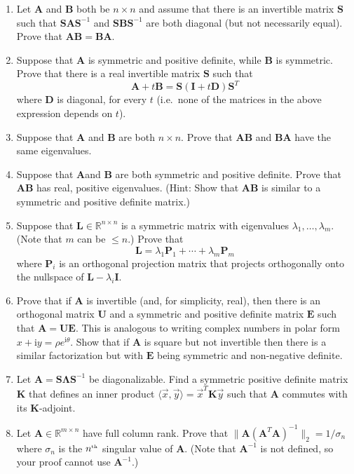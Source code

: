 \documentclass[11pt,fleqn]{article}
\newcommand{\mat}[1]{\mathbf{#1}}
\newcommand{\imag}{\mathrm{i}}
\begin{document}
\begin{enumerate}
\item Let $\mathbf{A}$ and $\mathbf{B}$ both be $n\times n$ and assume that there is an invertible matrix $\mathbf{S}$ such that $\mathbf{SAS}^{-1}$ and  $\mathbf{SBS}^{-1}$ are both diagonal (but not necessarily equal). Prove that $\mathbf{AB} = \mathbf{BA}$.

\item Suppose that $\mathbf{A}$ is symmetric and positive definite, while $\mathbf{B}$ is symmetric. Prove that there is a real invertible matrix $\mathbf{S}$ such that
\[\mathbf{A} + t \mathbf{B} = \mathbf{S}\left(\mathbf{I} + t\mathbf{D}\right)\mathbf{S}^T\]
where $\mathbf{D}$ is diagonal, for every $t$ (i.e.\ none of the matrices in the above expression depends on $t$).

\item Suppose that $\mathbf{A}$ and $\mathbf{B}$ are both $n\times n$. Prove that $\mathbf{AB}$ and $\mathbf{BA}$ have the same eigenvalues. %

\item Suppose that $\mathbf{A}$and $\mathbf{B}$ are both symmetric and positive definite. Prove that $\mathbf{AB}$ has real, positive eigenvalues. (Hint: Show that {\bf AB} is similar to a symmetric and positive definite matrix.)

\item Suppose that $\mathbf{L}\in\mathbb{R}^{n\times n}$ is a symmetric matrix with eigenvalues $\lambda_1,\ldots,\lambda_m$. (Note that $m$ can be $\le n$.) Prove that
\[\mathbf{L} = \lambda_1 \mathbf{P}_1 + \cdots+\lambda_m\mathbf{P}_m\]
where $\mathbf{P}_i$ is an orthogonal projection matrix that projects orthogonally onto the nullspace of $\mathbf{L} - \lambda_i\mathbf{I}$.

\item Prove that if $\mathbf{A}$ is invertible (and, for simplicity, real), then there is an orthogonal matrix $\mathbf{U}$ and a symmetric and positive definite matrix $\mathbf{E}$ such that $\mathbf{A} = \mathbf{UE}$. This is analogous to writing complex numbers in polar form $x+\imag y = \rho e^{\imag \theta}$. Show that if $\mathbf{A}$ is square but not invertible then there is a similar factorization but with $\mathbf{E}$ being symmetric and non-negative definite.

\item Let $\mathbf{A} = \mathbf{S\Lambda S}^{-1}$ be diagonalizable. Find a symmetric positive definite matrix $\mathbf{K}$ that defines an inner product $\langle\vec{x},\vec{y}\rangle =\vec{x}^T\mat{K}\vec{y}$ such that $\mathbf{A}$ commutes with its $\mat{K}$-adjoint.

\item Let $\mat{A}\in\mathbb{R}^{m\times n}$ have full column rank. Prove that $\|\mat{A}(\mat{A}^T\mat{A})^{-1}\|_2=1/\sigma_n$ where $\sigma_n$ is the $n^{\mbox{\tiny th}}$ singular value of $\mat{A}$. (Note that $\mat{A}^{-1}$ is not defined, so your proof cannot use $\mat{A}^{-1}$.)
\end{enumerate}
 
\end{document}
